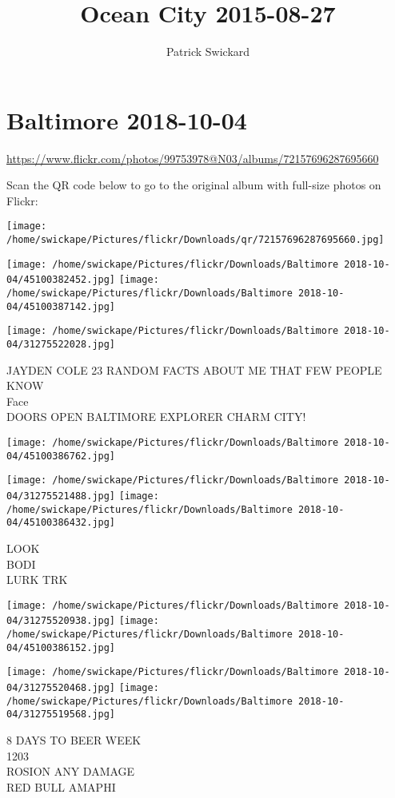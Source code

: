 \documentclass[10pt,letterpaper]{article}
\title{Ocean City 2015-08-27}
\author{Patrick Swickard}
\date{}
\begin{document}
\section*{Baltimore 2018-10-04}

\url{https://www.flickr.com/photos/99753978@N03/albums/72157696287695660}

Scan the QR code below to go to the original album with full-size photos on Flickr:

\texttt{[image: /home/swickape/Pictures/flickr/Downloads/qr/72157696287695660.jpg]}
\pagebreak

\texttt{[image: /home/swickape/Pictures/flickr/Downloads/Baltimore 2018-10-04/45100382452.jpg]}
\texttt{[image: /home/swickape/Pictures/flickr/Downloads/Baltimore 2018-10-04/45100387142.jpg]}

\texttt{[image: /home/swickape/Pictures/flickr/Downloads/Baltimore 2018-10-04/31275522028.jpg]}

JAYDEN COLE 23 RANDOM FACTS ABOUT ME THAT FEW PEOPLE KNOW\\
Face\\
DOORS OPEN BALTIMORE EXPLORER CHARM CITY!
\pagebreak

\texttt{[image: /home/swickape/Pictures/flickr/Downloads/Baltimore 2018-10-04/45100386762.jpg]}

\vspace{0.25in}
\texttt{[image: /home/swickape/Pictures/flickr/Downloads/Baltimore 2018-10-04/31275521488.jpg]}
\texttt{[image: /home/swickape/Pictures/flickr/Downloads/Baltimore 2018-10-04/45100386432.jpg]}

LOOK\\
BODI\\
LURK TRK
\pagebreak

\texttt{[image: /home/swickape/Pictures/flickr/Downloads/Baltimore 2018-10-04/31275520938.jpg]}
\texttt{[image: /home/swickape/Pictures/flickr/Downloads/Baltimore 2018-10-04/45100386152.jpg]}

\texttt{[image: /home/swickape/Pictures/flickr/Downloads/Baltimore 2018-10-04/31275520468.jpg]}
\texttt{[image: /home/swickape/Pictures/flickr/Downloads/Baltimore 2018-10-04/31275519568.jpg]}

8 DAYS TO BEER WEEK\\
1203\\
ROSION ANY DAMAGE\\
RED BULL AMAPHI
\pagebreak
\end{document}
